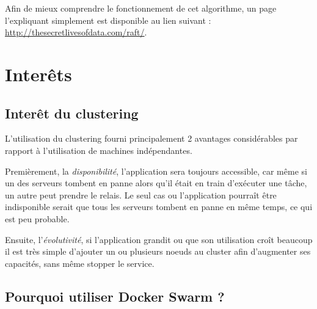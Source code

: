 Afin de mieux comprendre le fonctionnement de cet algorithme, un page l'expliquant simplement
est disponible au lien suivant : 
\href{http://thesecretlivesofdata.com/raft/}{http://thesecretlivesofdata.com/raft/}.

\chapter{Interêts}

\section{Interêt du clustering}

L'utilisation du clustering fourni principalement 2 avantages considérables par rapport à
l'utilisation de machines indépendantes.\newline

Premièrement, la \emph{disponibilité}, l'application sera toujours accessible, car même si un des
serveurs tombent en panne alors qu'il était en train d'exécuter une tâche, un autre peut prendre
le relais. Le seul cas ou l'application pourraît être indisponible serait que tous les serveurs
tombent en panne en même temps, ce qui est peu probable.\newline

Ensuite, l'\emph{évolutivité}, si l'application grandit ou que son utilisation croît beaucoup
il est très simple d'ajouter un ou plusieurs noeuds au cluster afin d'augmenter ses capacités,
sans même stopper le service.

\section{Pourquoi utiliser Docker Swarm ?}

